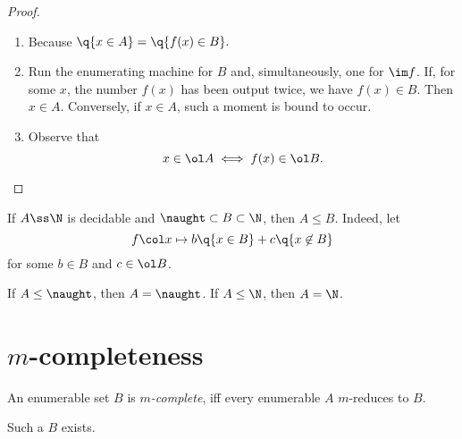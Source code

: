 \begin{proof}
  ~\begin{enumerate}
    \item Because $\q{x \in A} = \q{f(x) \in B}.$ 
    \item Run the enumerating machine for $B$ and, simultaneously, one for $\im f$. If, for some $x$, the number $f(x)$ has been output twice, we have $f(x) \in B$. Then $x \in A$. Conversely, if $x \in A$, such a moment is bound to occur.
    \item Observe that
    $$ x \in \ol A \iff f(x) \in \ol B. $$
  \end{enumerate}
\end{proof}

\begin{example}
  If $A \ss \N$ is decidable and $\naught \subset B \subset \N$, then $A \le B$. Indeed, let
  $$ f \col x \mapsto b \q{x \in B} + c \q{x \not\in B} $$
  for some $b \in B$ and $c \in \ol B$. 
\end{example}

\begin{example}
  If $A \le \naught$, then $A = \naught$.
  If $A \le \N$, then $A = \N$.
\end{example}

\section{$m$-completeness}

\begin{definition}
  An enumerable set $B$ is \emph{$m$-complete}, iff every enumerable $A$ $m$-reduces to $B$.
\end{definition}

\begin{theorem}
  Such a $B$ exists.  
\end{theorem}
